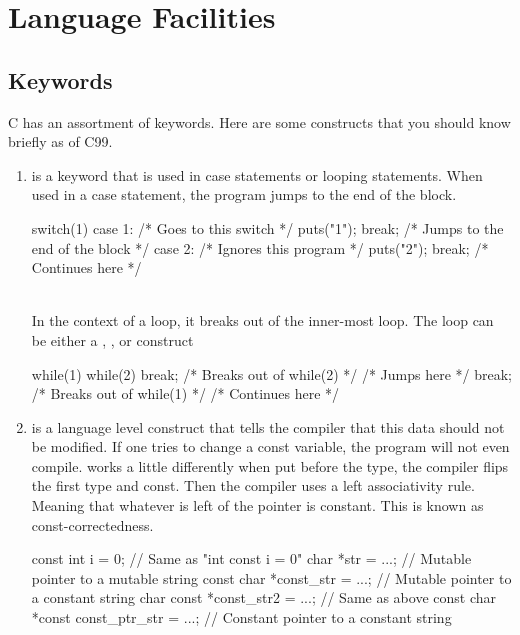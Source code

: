 \section{Language Facilities}

\subsection{Keywords}

C has an assortment of keywords. Here are some constructs that you should know briefly as of C99.

\begin{enumerate}
\item {} is a keyword that is used in case statements or looping statements. When used in a case statement, the program jumps to the end of the block.
\\
\begin{code}[language=C]
switch(1) {
  case 1: /* Goes to this switch */
    puts("1");
    break; /* Jumps to the end of the block */
  case 2: /* Ignores this program */
    puts("2");
    break;
} /* Continues here */
\end{code}
\\
In the context of a loop, it breaks out of the inner-most loop. The loop can be either a , , or  construct
\\
\begin{code}[language=C]
while(1) {
  while(2) {
    break; /* Breaks out of while(2) */
  } /* Jumps here */
  break; /* Breaks out of while(1) */
} /* Continues here */
\end{code}
\item {} is a language level construct that tells the compiler that this data should not be modified. If one tries to change a const variable, the program will not even compile.  works a little differently when put before the type, the compiler flips the first type and const. Then the compiler uses a left associativity rule. Meaning that whatever is left of the pointer is constant. This is known as const-correctedness.
\\
\begin{code}[language=C]
const int i = 0; // Same as "int const i = 0"
char *str = ...; // Mutable pointer to a mutable string
const char *const_str = ...; // Mutable pointer to a constant string
char const *const_str2 = ...; // Same as above
const char *const const_ptr_str = ...;
// Constant pointer to a constant string
\end{code}


\end{enumerate}
